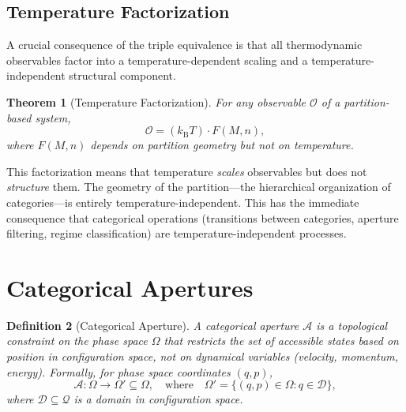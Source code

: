 \documentclass[twocolumn,10pt]{article}
\newtheorem{theorem}{Theorem}[section]
\newtheorem{definition}[theorem]{Definition}
\newcommand{\kB}{k_{\mathrm{B}}}
\begin{document}
\subsection{Temperature Factorization}

A crucial consequence of the triple equivalence is that all thermodynamic observables factor into a temperature-dependent scaling and a temperature-independent structural component.

\begin{theorem}[Temperature Factorization]
\label{thm:temp_factor}
For any observable $\mathcal{O}$ of a partition-based system,
\begin{equation}
  \mathcal{O} = (\kB T) \cdot F(M, n),
  \label{eq:temp_factor}
\end{equation}
where $F(M, n)$ depends on partition geometry but not on temperature.
\end{theorem}

This factorization means that temperature \emph{scales} observables but does not \emph{structure} them.  The geometry of the partition---the hierarchical organization of categories---is entirely temperature-independent.  This has the immediate consequence that categorical operations (transitions between categories, aperture filtering, regime classification) are temperature-independent processes.

\section{Categorical Apertures}
\label{sec:apertures}

\begin{definition}[Categorical Aperture]
\label{def:aperture}
A \emph{categorical aperture} $\mathcal{A}$ is a topological constraint on the phase space $\Omega$ that restricts the set of accessible states based on position in configuration space, not on dynamical variables (velocity, momentum, energy).  Formally, for phase space coordinates $(q, p)$,
\begin{equation}
  \mathcal{A}: \Omega \to \Omega' \subseteq \Omega, \quad \text{where} \quad \Omega' = \{(q, p) \in \Omega : q \in \mathcal{D}\},
  \label{eq:aperture_def}
\end{equation}
where $\mathcal{D} \subseteq \mathcal{Q}$ is a domain in configuration space.
\end{definition}
\end{document}
